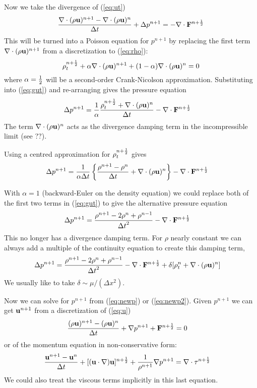 \documentclass[10pt]{article}
\begin{document}
Now we take the divergence of (\ref{eq:ut}) 
\begin{align}
  {\nabla\cdot(\rho{\bf u})^{n+1} - \nabla\cdot(\rho{\bf u})^{n} \over {\Delta t}}
       + \Delta p^{n+1}  = -\nabla\cdot{\bf F}^{n+{1\over2}}   \label{eq:gut}
\end{align}
This will be turned into a Poisson equation for $p^{n+1}$ by replacing the first 
term $\nabla\cdot(\rho{\bf u})^{n+1}$ from a discretization to (\ref{eq:rho}):
\[
  \rho_t^{n+{1\over2}}  + \alpha \nabla\cdot( \rho{\bf u} )^{n+1} + (1-\alpha) \nabla\cdot( \rho{\bf u} )^{n}= 0
\]
where $\alpha={1\over2}$ will be a second-order Crank-Nicolson approximation. Substituting into (\ref{eq:gut})
and re-arranging gives the pressure equation
\begin{align*}
   \Delta p^{n+1} & = { 1\over\alpha} { \rho_t^{n+{1\over2}} + \nabla\cdot( \rho{\bf u} )^{n} \over {\Delta t}} 
                      - \nabla\cdot{\bf F} ^{n+{1\over2}}   \label{eq:newp}
\end{align*}
The term $\nabla\cdot( \rho{\bf u} )^{n}$ 
acts as the divergence damping term in the incompressible limit (see ??).

Using a centred approximation for $\rho_t^{n+{1\over2}}$ gives 
\begin{align}
   \Delta p^{n+1} & = { 1\over \alpha  {\Delta t}} \left\{ {\rho^{n+1}-\rho^n \over {\Delta t}} + \nabla\cdot( \rho{\bf u} )^{n} \right\} 
                      - \nabla\cdot{\bf F} ^{n+{1\over2}}  
\end{align}


With $\alpha=1$ (backward-Euler on the density equation) 
we could replace both of the first two terms in (\ref{eq:gut}) to give the alternative pressure
equation
\begin{align*}
   \Delta p^{n+1} &= { \rho^{n+1} -2\rho^n + \rho^{n-1} \over {\Delta t}^2 }
                         -  \nabla\cdot{\bf F}^{n+{1\over2}}         
\end{align*}
This no longer has a divergence damping term. For $\rho$ nearly constant we can always
add a multiple of the continuity equation to create this damping term,
\begin{align*}
   \Delta p^{n+1} & = { \rho^{n+1} -2\rho^n + \rho^{n-1} \over {\Delta t}^2 } -  \nabla\cdot{\bf F}^{n+{1\over2}}  
                + \delta[ \rho_t^{n} + \nabla\cdot(\rho{\bf u})^n ]  \label{eq:newp2}
\end{align*}
We usually like to take $\delta\sim \mu/(\Delta x ^2)$.


Now we can solve for $p^{n+1}$ from (\ref{eq:newp}) or (\ref{eq:newp2}).
Given $p^{n+1}$ we can get ${\bf u}^{n+1}$ from a discretization of (\ref{eq:u}) 
\begin{align*}
  {(\rho{\bf u})^{n+1} - (\rho{\bf u})^n \over {\Delta t}} + \nabla p^{n+1} + {\bf F}^{n+{1\over2}} &= 0
\end{align*}
or of the momentum
equation in non-conservative form:
\begin{align*}
  {{\bf u}^{n+1} - {\bf u}^n \over {\Delta t}} + [({\bf u}\cdot\nabla){\bf u}]^{n+{1\over2}} + {1\over\rho^{n+1}} \nabla p^{n+1}
         &=  \nabla\cdot {\bf \tau}^{n+{1\over2}} 
\end{align*}
We could also treat the viscous terms implicitly in this last equation.





\end{document}
